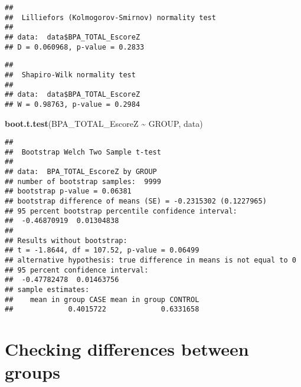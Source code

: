 \documentclass[
]{article}
\newenvironment{Shaded}{\begin{snugshade}}{\end{snugshade}}
\newcommand{\FunctionTok}[1]{\textcolor[rgb]{0.13,0.29,0.53}{\textbf{#1}}}
\newcommand{\NormalTok}[1]{#1}
\newcommand{\SpecialCharTok}[1]{\textcolor[rgb]{0.81,0.36,0.00}{\textbf{#1}}}
\begin{document}
\begin{Shaded}
\end{Shaded}

\begin{verbatim}
## 
##  Lilliefors (Kolmogorov-Smirnov) normality test
## 
## data:  data$BPA_TOTAL_EscoreZ
## D = 0.060968, p-value = 0.2833
\end{verbatim}

\begin{Shaded}
\end{Shaded}

\begin{verbatim}
## 
##  Shapiro-Wilk normality test
## 
## data:  data$BPA_TOTAL_EscoreZ
## W = 0.98763, p-value = 0.2984
\end{verbatim}

\begin{Shaded}
\begin{Highlighting}[]
\FunctionTok{boot.t.test}\NormalTok{(BPA\_TOTAL\_EscoreZ }\SpecialCharTok{\textasciitilde{}}\NormalTok{ GROUP, data)}
\end{Highlighting}
\end{Shaded}

\begin{verbatim}
## 
##  Bootstrap Welch Two Sample t-test
## 
## data:  BPA_TOTAL_EscoreZ by GROUP
## number of bootstrap samples:  9999
## bootstrap p-value = 0.06381 
## bootstrap difference of means (SE) = -0.2315302 (0.1227965) 
## 95 percent bootstrap percentile confidence interval:
##  -0.46870919  0.01304838
## 
## Results without bootstrap:
## t = -1.8644, df = 107.52, p-value = 0.06499
## alternative hypothesis: true difference in means is not equal to 0
## 95 percent confidence interval:
##  -0.47782478  0.01463756
## sample estimates:
##    mean in group CASE mean in group CONTROL 
##             0.4015722             0.6331658
\end{verbatim}

\section{\texorpdfstring{\textbf{Checking differences between
groups}}{Checking differences between groups}}\label{checking-differences-between-groups-4}
\end{document}
